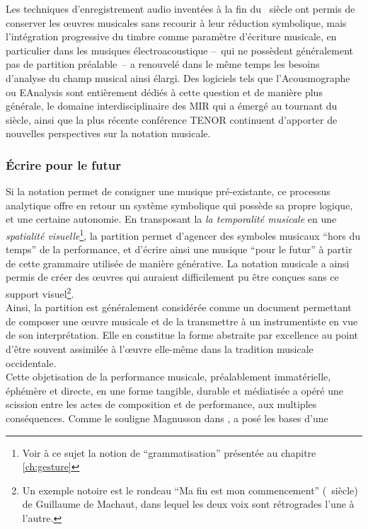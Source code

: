 \indent Les techniques d'enregistrement audio inventées à la fin du ~siècle ont permis de conserver les œuvres musicales sans recourir à leur réduction symbolique, mais l'intégration progressive du timbre comme paramètre d'écriture musicale, en particulier dans les musiques électroacoustique --~qui ne possèdent généralement pas de partition préalable~-- a renouvelé dans le même temps les besoins d'analyse du champ musical ainsi élargi. Des logiciels tels que l'Acousmographe \cite{favreau_lacousmographe_2010} ou EAnalysis \cite{couprie_eanalysis:_2016} sont entièrement dédiés à cette question et de manière plus générale, le domaine interdisciplinaire des \gls{MIR} qui a émergé au tournant du siècle, ainsi que la plus récente conférence \gls{TENOR} continuent d'apporter de nouvelles perspectives sur la notation musicale.

\subsubsection{Écrire pour le futur}

\noindent Si la notation permet de consigner une musique pré-existante, ce processus analytique offre en retour un système symbolique qui possède sa propre logique, et une certaine autonomie. En transposant la \textit{la temporalité musicale} en une \textit{spatialité visuelle}\footnote{Voir à ce sujet la notion de ``grammatisation'' présentée au chapitre \ref{ch:gesture}}, la partition permet d'agencer des symboles musicaux ``hors du temps'' de la performance, et d'écrire ainsi une musique ``pour le futur'' à partir de cette grammaire utilisée de manière générative. La notation musicale a ainsi permis de créer des œuvres qui auraient difficilement pu être conçues sans ce support visuel\footnote{Un exemple notoire est le rondeau ``Ma fin est mon commencement'' (~siècle) de Guillaume de Machaut, dans lequel les deux voix sont rétrogrades l'une à l'autre.}.\\
\indent Ainsi, la partition est généralement considérée comme un document permettant de composer une œuvre musicale et de la transmettre à un instrumentiste en vue de son interprétation. Elle en constitue la forme abstraite par excellence au point d'être souvent assimilée à l'œuvre elle-même dans la tradition musicale occidentale.\\
\indent Cette objetisation de la performance musicale, préalablement immatérielle, éphémère et directe, en une forme tangible, durable et médiatisée a opéré une scission entre les actes de composition et de performance, aux multiples conséquences. Comme le souligne Magnusson dans \cite{magnusson_algorithms_2011},  a posé les bases d'une 

